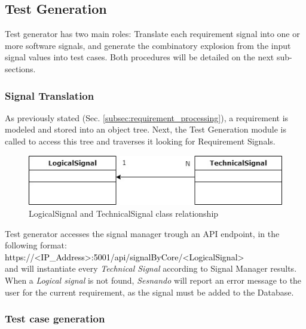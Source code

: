 \subsection{Test Generation}
\label{subsec:test_generation}

Test generator has two main roles: Translate each requirement signal into one or more software signals, and generate the combinatory explosion from the input signal values into test cases. Both procedures will be detailed on the next sub-sections.


\subsubsection{Signal Translation}
\label{subsubsec:signal_translation}

As previously stated (Sec. \ref{subsec:requirement_processing}), a requirement is modeled and stored into an object tree. Next, the Test Generation module is called to access this tree and traverses it looking for Requirement Signals.

\begin{figure}[H]
    \centering
    \includegraphics[scale=0.625]{images/class_diag_logical_technical_signal.jpg}
    \caption{LogicalSignal and TechnicalSignal class relationship}
    \label{fig:logical_technical_signal}
\end{figure}

Test generator accesses the signal manager trough an API endpoint, in the following format:\\
\textcolor{black}{https://<IP\_Address>:5001/api/signalByCore/<LogicalSignal>}\\
and will instantiate every \textit{Technical Signal} according to Signal Manager results. When a \textit{Logical signal} is not found, \textit{Sesnando} will report an error message to the user for the current requirement, as the signal must be added to the Database.


\subsubsection{Test case generation}
\label{subsubsec:test_cases}


